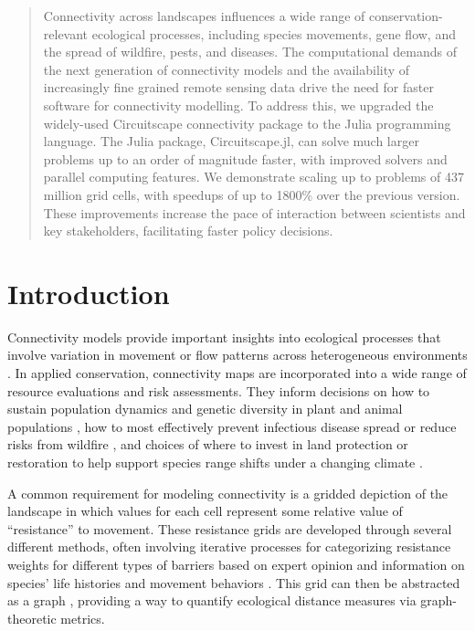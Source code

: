 \documentclass{juliacon}
\begin{document}

\maketitle

\begin{abstract}
Connectivity across landscapes influences a wide range of conservation-relevant ecological processes, including species movements, gene flow, and the spread of wildfire, pests, and diseases. The computational demands of the next generation of connectivity models and the availability of increasingly fine grained remote sensing data drive the need for faster software for connectivity modelling. To address this, we upgraded the widely-used Circuitscape connectivity package to the Julia programming language. The Julia package, Circuitscape.jl, can solve much larger problems up to an order of magnitude faster, with improved solvers and parallel computing features. We demonstrate scaling up to problems of 437 million grid cells, with speedups of up to 1800\% over the previous version. These improvements increase the pace of interaction between scientists and key stakeholders, facilitating faster policy decisions. 

\end{abstract}

\section{Introduction}
Connectivity models provide important insights into ecological processes that involve variation in movement or flow patterns across heterogeneous environments \cite{crooks2006}. In applied conservation, connectivity maps are incorporated into a wide range of resource evaluations and risk assessments. They inform decisions on how to sustain population dynamics and genetic diversity in plant and animal populations \cite{kareiva1995connecting}, how to most effectively prevent infectious disease spread or reduce risks from wildfire \cite{gray2016applying}, and choices of where to invest in land protection or restoration to help support species range shifts under a changing climate \cite{heller2009biodiversity, littlefield2017connecting, keeley2017habitat}.  

A common requirement for modeling connectivity is a gridded depiction of the landscape in which values for each cell represent some relative value of “resistance” to movement. These resistance grids are developed through several different methods, often involving iterative processes for categorizing resistance weights for different types of barriers based on expert opinion and information on species’ life histories and movement behaviors \cite{spear2010use, zeller2012estimating}. This grid can then be abstracted as a graph \cite{urban2001landscape}, providing a way to quantify ecological distance measures via graph-theoretic metrics. 
\end{document}
